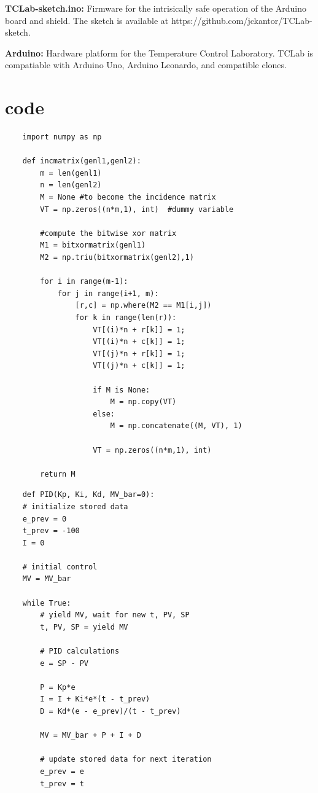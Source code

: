     \textbf{TCLab-sketch.ino:} Firmware for the intrisically safe operation of the Arduino board and shield. The sketch is available at https://github.com/jckantor/TCLab-sketch.

    \textbf{Arduino:}  Hardware platform for the Temperature Control Laboratory. TCLab is compatiable with Arduino Uno, Arduino Leonardo, and compatible clones.


\section{code}

\begin{verbatim}
    import numpy as np
        
    def incmatrix(genl1,genl2):
        m = len(genl1)
        n = len(genl2)
        M = None #to become the incidence matrix
        VT = np.zeros((n*m,1), int)  #dummy variable
        
        #compute the bitwise xor matrix
        M1 = bitxormatrix(genl1)
        M2 = np.triu(bitxormatrix(genl2),1) 
    
        for i in range(m-1):
            for j in range(i+1, m):
                [r,c] = np.where(M2 == M1[i,j])
                for k in range(len(r)):
                    VT[(i)*n + r[k]] = 1;
                    VT[(i)*n + c[k]] = 1;
                    VT[(j)*n + r[k]] = 1;
                    VT[(j)*n + c[k]] = 1;
                    
                    if M is None:
                        M = np.copy(VT)
                    else:
                        M = np.concatenate((M, VT), 1)
                    
                    VT = np.zeros((n*m,1), int)
        
        return M
    \end{verbatim}



\begin{verbatim}
    def PID(Kp, Ki, Kd, MV_bar=0):
    # initialize stored data
    e_prev = 0
    t_prev = -100
    I = 0
    
    # initial control
    MV = MV_bar
    
    while True:
        # yield MV, wait for new t, PV, SP
        t, PV, SP = yield MV
        
        # PID calculations
        e = SP - PV
        
        P = Kp*e
        I = I + Ki*e*(t - t_prev)
        D = Kd*(e - e_prev)/(t - t_prev)
        
        MV = MV_bar + P + I + D
        
        # update stored data for next iteration
        e_prev = e
        t_prev = t

    \end{verbatim}


